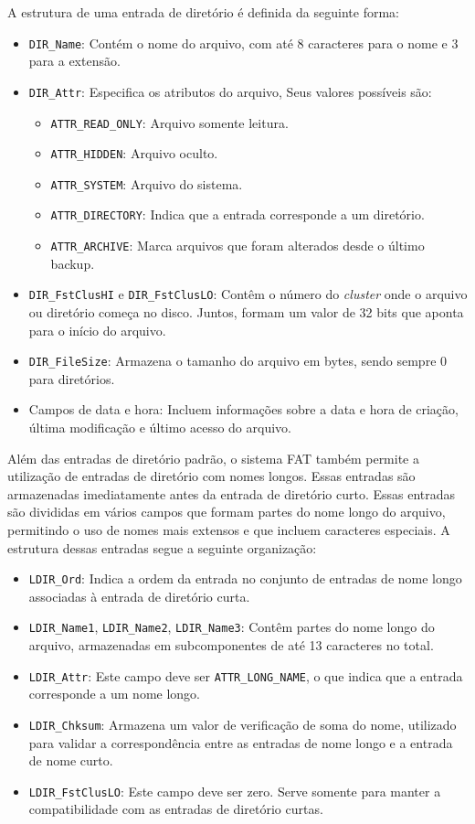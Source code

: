 \documentclass[
    12pt,				%
    oneside,   	        %
    a4paper,			%
    english,			%
    french,				%
    spanish,			%
    brazil,				%
    ]{pacotes/abntex2}
\begin{document}
A estrutura de uma entrada de diretório é definida da seguinte forma:

\begin{itemize} 
    \item \texttt{DIR\_Name}: Contém o nome do arquivo, com até 8 caracteres para o nome e 3 para a extensão.
    \item \texttt{DIR\_Attr}: Especifica os atributos do arquivo, Seus valores possíveis são:
    \begin{itemize} 
        \item \texttt{ATTR\_READ\_ONLY}: Arquivo somente leitura.
        \item \texttt{ATTR\_HIDDEN}: Arquivo oculto.
        \item \texttt{ATTR\_SYSTEM}: Arquivo do sistema.
        \item \texttt{ATTR\_DIRECTORY}: Indica que a entrada corresponde a um diretório.
        \item \texttt{ATTR\_ARCHIVE}: Marca arquivos que foram  alterados desde o último backup.
    \end{itemize}
    \item \texttt{DIR\_FstClusHI} e \texttt{DIR\_FstClusLO}: Contêm o número do \textit{cluster} onde o arquivo ou diretório começa no disco. Juntos, formam um valor de 32 bits que aponta para o início do arquivo. 
    \item \texttt{DIR\_FileSize}: Armazena o tamanho do arquivo em bytes, sendo sempre 0 para diretórios. 
    \item Campos de data e hora: Incluem informações sobre a data e hora de criação, última modificação e último acesso do arquivo.
\end{itemize}

Além das entradas de diretório padrão, o sistema FAT também permite a utilização de entradas de diretório com nomes longos. Essas entradas são armazenadas imediatamente antes da entrada de diretório curto. Essas entradas são divididas em vários campos que formam partes do nome longo do arquivo, permitindo o uso de nomes mais extensos e que incluem caracteres especiais. A estrutura dessas entradas segue a seguinte organização:

\begin{itemize} 
    \item \texttt{LDIR\_Ord}: Indica a ordem da entrada no conjunto de entradas de nome longo associadas à entrada de diretório curta.
    \item \texttt{LDIR\_Name1}, \texttt{LDIR\_Name2}, \texttt{LDIR\_Name3}: Contêm partes do nome longo do arquivo, armazenadas em subcomponentes de até 13 caracteres no total.
    \item \texttt{LDIR\_Attr}: Este campo deve ser \texttt{ATTR\_LONG\_NAME}, o que indica que a entrada corresponde a um nome longo.
    \item \texttt{LDIR\_Chksum}: Armazena um valor de verificação de soma do nome, utilizado para validar a correspondência entre as entradas de nome longo e a entrada de nome curto.
    \item \texttt{LDIR\_FstClusLO}: Este campo deve ser zero. Serve somente para manter a compatibilidade com as entradas de diretório curtas.
\end{itemize}
\end{document}
